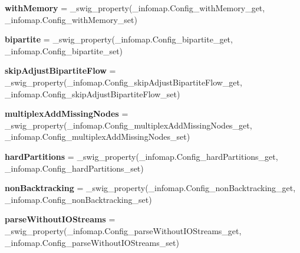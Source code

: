 \begin{DoxyCompactItemize}
{\bfseries with\+Memory} = \+\_\+swig\+\_\+property(\+\_\+infomap.\+Config\+\_\+with\+Memory\+\_\+get, \+\_\+infomap.\+Config\+\_\+with\+Memory\+\_\+set)
\item 
\mbox{\label{classdsmacc_1_1graph_1_1infomap_1_1Config_aa61b42fe416858af88c8747f9dfb38fe}} 
{\bfseries bipartite} = \+\_\+swig\+\_\+property(\+\_\+infomap.\+Config\+\_\+bipartite\+\_\+get, \+\_\+infomap.\+Config\+\_\+bipartite\+\_\+set)
\item 
\mbox{\label{classdsmacc_1_1graph_1_1infomap_1_1Config_a40a8a3abb978e8a59601f59ae11d7a8e}} 
{\bfseries skip\+Adjust\+Bipartite\+Flow} = \+\_\+swig\+\_\+property(\+\_\+infomap.\+Config\+\_\+skip\+Adjust\+Bipartite\+Flow\+\_\+get, \+\_\+infomap.\+Config\+\_\+skip\+Adjust\+Bipartite\+Flow\+\_\+set)
\item 
\mbox{\label{classdsmacc_1_1graph_1_1infomap_1_1Config_a0da1dca1747947e71849b380ea5822c4}} 
{\bfseries multiplex\+Add\+Missing\+Nodes} = \+\_\+swig\+\_\+property(\+\_\+infomap.\+Config\+\_\+multiplex\+Add\+Missing\+Nodes\+\_\+get, \+\_\+infomap.\+Config\+\_\+multiplex\+Add\+Missing\+Nodes\+\_\+set)
\item 
\mbox{\label{classdsmacc_1_1graph_1_1infomap_1_1Config_af9d6fed3c5d73bc3f167dcf22547ec79}} 
{\bfseries hard\+Partitions} = \+\_\+swig\+\_\+property(\+\_\+infomap.\+Config\+\_\+hard\+Partitions\+\_\+get, \+\_\+infomap.\+Config\+\_\+hard\+Partitions\+\_\+set)
\item 
\mbox{\label{classdsmacc_1_1graph_1_1infomap_1_1Config_a359d5af4080052d633b0e54ee51bda06}} 
{\bfseries non\+Backtracking} = \+\_\+swig\+\_\+property(\+\_\+infomap.\+Config\+\_\+non\+Backtracking\+\_\+get, \+\_\+infomap.\+Config\+\_\+non\+Backtracking\+\_\+set)
\item 
\mbox{\label{classdsmacc_1_1graph_1_1infomap_1_1Config_a1cd437c667051a4d4aa28a397ba0f587}} 
{\bfseries parse\+Without\+I\+O\+Streams} = \+\_\+swig\+\_\+property(\+\_\+infomap.\+Config\+\_\+parse\+Without\+I\+O\+Streams\+\_\+get, \+\_\+infomap.\+Config\+\_\+parse\+Without\+I\+O\+Streams\+\_\+set)

\end{DoxyCompactItemize}
